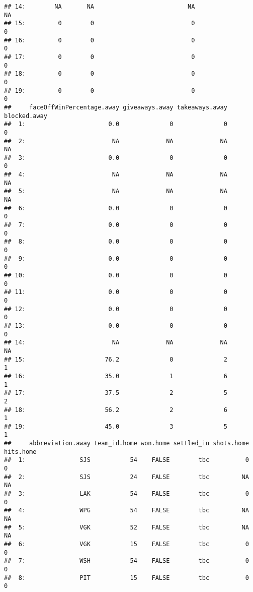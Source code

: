 \documentclass[
]{article}
\begin{document}
\begin{verbatim}
## 14:        NA       NA                          NA                  NA
## 15:         0        0                           0                   0
## 16:         0        0                           0                   0
## 17:         0        0                           0                   0
## 18:         0        0                           0                   0
## 19:         0        0                           0                   0
##     faceOffWinPercentage.away giveaways.away takeaways.away blocked.away
##  1:                       0.0              0              0            0
##  2:                        NA             NA             NA           NA
##  3:                       0.0              0              0            0
##  4:                        NA             NA             NA           NA
##  5:                        NA             NA             NA           NA
##  6:                       0.0              0              0            0
##  7:                       0.0              0              0            0
##  8:                       0.0              0              0            0
##  9:                       0.0              0              0            0
## 10:                       0.0              0              0            0
## 11:                       0.0              0              0            0
## 12:                       0.0              0              0            0
## 13:                       0.0              0              0            0
## 14:                        NA             NA             NA           NA
## 15:                      76.2              0              2            1
## 16:                      35.0              1              6            1
## 17:                      37.5              2              5            2
## 18:                      56.2              2              6            1
## 19:                      45.0              3              5            1
##     abbreviation.away team_id.home won.home settled_in shots.home hits.home
##  1:               SJS           54    FALSE        tbc          0         0
##  2:               SJS           24    FALSE        tbc         NA        NA
##  3:               LAK           54    FALSE        tbc          0         0
##  4:               WPG           54    FALSE        tbc         NA        NA
##  5:               VGK           52    FALSE        tbc         NA        NA
##  6:               VGK           15    FALSE        tbc          0         0
##  7:               WSH           54    FALSE        tbc          0         0
##  8:               PIT           15    FALSE        tbc          0         0

\end{verbatim}
\end{document}
